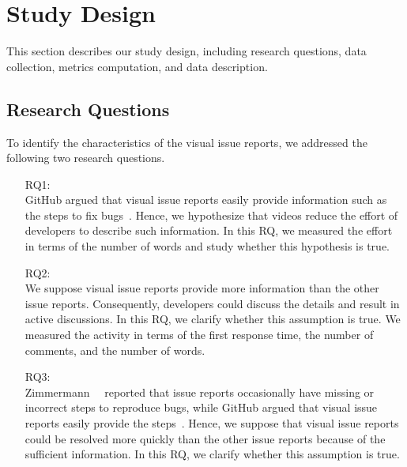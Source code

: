 \section{Study Design}
\label{sec:design}

This section describes our study design, including research questions, data collection, metrics computation, and data description.

\subsection{Research Questions}
\label{sec:rqs}

To identify the characteristics of the visual issue reports, we addressed the following two research questions. 
\begin{itemize}
	\item[RQ1:] \textbf{\RQone{}}\\
	GitHub argued that visual issue reports easily provide 
	information such as the steps to fix bugs~\citep{github-video-blog}. 
	Hence, we hypothesize that videos reduce the effort of 
	developers to describe such information. 
	In this RQ, we measured the effort in terms of 
	the number of words and 
	study whether this hypothesis is true. 
	\item[RQ2:] \textbf{\RQtwo{}}\\
	We suppose visual issue reports provide 
	more information than the other issue reports. 
	Consequently, developers could discuss the details and 
	result in active discussions. 
	In this RQ, we clarify whether this assumption is true. 
	We measured the activity in terms of 
	the first response time, 
	the number of comments, and 
	the number of words. 
	\item[RQ3:] \textbf{\RQthree{}}\\
	Zimmermann~\et~\citep{zimmermann2010TSE} reported that
	issue reports occasionally have missing or incorrect steps 
	to reproduce bugs, 
	while GitHub argued that visual issue reports easily 
	provide the steps~\citep{github-video-blog}. 
	Hence, we suppose that visual issue reports could be 
	resolved more quickly than the other issue reports 
	because of the sufficient information. 
	In this RQ, we clarify whether this assumption is true. 
\end{itemize}

